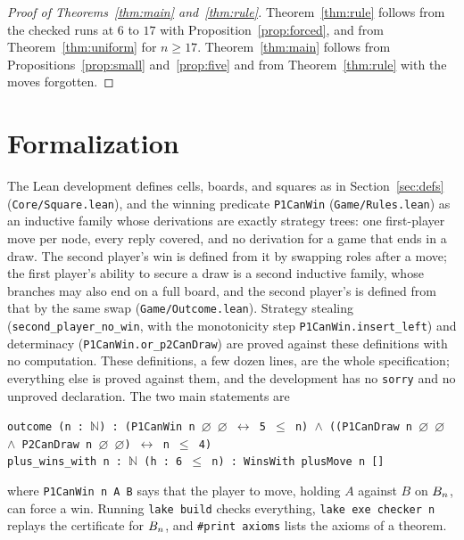 \documentclass[11pt]{amsart}
\theoremstyle{definition}
\theoremstyle{remark}
\begin{document}
\begin{proof}[Proof of Theorems~\ref{thm:main} and~\ref{thm:rule}]
Theorem~\ref{thm:rule} follows from the checked runs at $6$ to $17$
with Proposition~\ref{prop:forced}, and from Theorem~\ref{thm:uniform}
for $n \ge 17$. Theorem~\ref{thm:main} follows from
Propositions~\ref{prop:small} and~\ref{prop:five} and from
Theorem~\ref{thm:rule} with the moves forgotten.
\end{proof}

\section{Formalization}\label{sec:lean}

The Lean development defines cells, boards, and squares as in
Section~\ref{sec:defs} (\texttt{Core/Square.lean}), and the winning
predicate \texttt{P1CanWin} (\texttt{Game/Rules.lean}) as an inductive
family whose derivations are exactly strategy trees: one first-player
move per node, every reply covered, and no derivation for a game that
ends in a draw. The second player's win is defined from it by swapping
roles after a move; the first player's ability to secure a draw is a
second inductive family, whose branches may also end on a full board,
and the second player's is defined from that by the same swap
(\texttt{Game/Outcome.lean}). Strategy stealing
(\texttt{second\_player\_no\_win}, with the monotonicity step
\texttt{P1CanWin.insert\_left}) and determinacy
(\texttt{P1CanWin.or\_p2CanDraw}) are proved against these definitions
with no computation. These definitions, a few dozen lines, are the
whole specification; everything else is proved against them, and the
development has no \texttt{sorry} and no unproved declaration. The two
main statements are
\begin{center}\small
\texttt{outcome (n : $\mathbb{N}$) : (P1CanWin n $\varnothing$
$\varnothing$ $\leftrightarrow$ 5 $\le$ n) $\wedge$ ((P1CanDraw n
$\varnothing$ $\varnothing$ $\wedge$ P2CanDraw n $\varnothing$
$\varnothing$) $\leftrightarrow$ n $\le$ 4)}\\[2pt]
\texttt{plus\_wins\_with  n : $\mathbb{N}$\ (h : 6 $\le$ n) :
WinsWith plusMove n []}
\end{center}
where \texttt{P1CanWin n A B} says that the player to move, holding
$A$ against $B$ on $B_n$, can force a win. Running
\texttt{lake build} checks everything, \texttt{lake exe checker n}
replays the certificate for $B_n$, and \texttt{\#print axioms}
lists the axioms of a theorem.
\end{document}
